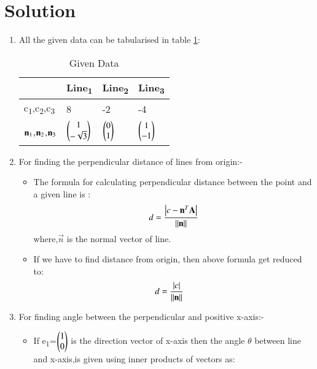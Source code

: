\documentclass[journal,12pt,twocolumn]{IEEEtran}
\begin{document}
\section{Solution}
\begin{enumerate}
\item  All the given data can be tabularised in table \ref{tab:table1}:
\begin{table}[!ht]
\begin{center}
\begin{tabular}{ | m{2cm} | m{1.2cm}| m{1.2cm} | m{1.2cm} |} 
\hline
 & Line\textsubscript{1} & Line\textsubscript{2} & Line\textsubscript{3} \\
\hline
c\textsubscript{1},c\textsubscript{2},c\textsubscript{3} & 8 & -2 & -4 \\ 
\hline
$\vec{n\textsubscript{1}}$,$\vec{n\textsubscript{2}}$,$\vec{n\textsubscript{3}}$ & $\myvec{1\\-\sqrt{3}}$ & $\myvec{0\\1}$ &$\myvec{1\\-1}$ \\ 
\hline
\end{tabular}
\end{center}
\caption{Given Data}
\label{tab:table1}
\end{table}
\item For finding the perpendicular distance of lines from origin:-
\begin{itemize}
\item The formula for calculating perpendicular distance between the point and a given line is :
\begin{align}
d=\frac { \left| c-\vec{n}^T\vec{A} \right| }{ \norm{\vec{n}} }
\end{align}
where,$\vec{n}$ is the normal vector of line.
\item If we have to find distance from origin, then above formula get reduced to:
\begin{align}
d&=\frac { \left| c \right| }{\norm{\vec{n}}}\label{eqA}
\end{align}
\end{itemize}
\item For finding angle between the perpendicular and positive x-axis:-
\begin{itemize}
\item If e\textsubscript{1}=$\myvec{1\\0}$ is the direction vector of x-axis then the angle $\theta$  between line and x-axis,is given using inner products of vectors as:

\end{itemize}
\end{enumerate}
\end{document}
